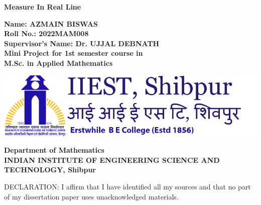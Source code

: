 \begin{titlepage}
    \begin{center}

        \vspace{2cm}

        \Huge{\textbf{Measure In Real Line}}

        \vspace{4cm}

        \Large\textbf{{
                Name: AZMAIN BISWAS\\
                Roll No.: 2022MAM008\\
                Supervisor's Name: Dr. UJJAL DEBNATH\\
                Mini Project for 1st semester course in\\
                M.Sc. in Applied Mathematics}}

        \vspace{2cm}

        \includegraphics[scale = 0.4]{pic/iiest.png}

        \vspace{2cm}

        \Large\textbf{{
                Department of Mathematics\\
                INDIAN INSTITUTE OF ENGINEERING SCIENCE AND TECHNOLOGY, Shibpur}}

                \vspace{5cm}

        \large{DECLARATION: I affirm that I have identified all my sources and that no part of my dissertation paper uses unacknowledged materials.}
    \end{center}
\end{titlepage}

